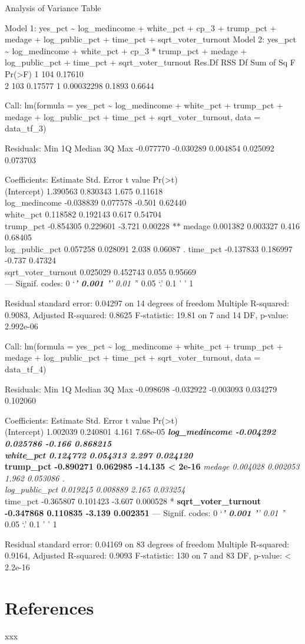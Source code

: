 \documentclass[
]{article}
\begin{document}
Analysis of Variance Table

Model 1: yes\_pct \textasciitilde{} log\_medincome + white\_pct + cp\_3
+ trump\_pct + medage + log\_public\_pct + time\_pct +
sqrt\_voter\_turnout Model 2: yes\_pct \textasciitilde{} log\_medincome
+ white\_pct + cp\_3 * trump\_pct + medage + log\_public\_pct +
time\_pct + sqrt\_voter\_turnout Res.Df RSS Df Sum of Sq F
Pr(\textgreater F) 1 104 0.17610\\
2 103 0.17577 1 0.00032298 0.1893 0.6644

Call: lm(formula = yes\_pct \textasciitilde{} log\_medincome +
white\_pct + trump\_pct + medage + log\_public\_pct + time\_pct +
sqrt\_voter\_turnout, data = data\_tf\_3)

Residuals: Min 1Q Median 3Q Max -0.077770 -0.030289 0.004854 0.025092
0.073703

Coefficients: Estimate Std. Error t value
Pr(\textgreater\textbar t\textbar)\\
(Intercept) 1.390563 0.830343 1.675 0.11618\\
log\_medincome -0.038839 0.077578 -0.501 0.62440\\
white\_pct 0.118582 0.192143 0.617 0.54704\\
trump\_pct -0.854305 0.229601 -3.721 0.00228 ** medage 0.001382 0.003327
0.416 0.68405\\
log\_public\_pct 0.057258 0.028091 2.038 0.06087 . time\_pct -0.137833
0.186997 -0.737 0.47324\\
sqrt\_voter\_turnout 0.025029 0.452743 0.055 0.95669\\
--- Signif. codes: 0 `\emph{\textbf{' 0.001 '}' 0.01 '}' 0.05 `.' 0.1 '
' 1

Residual standard error: 0.04297 on 14 degrees of freedom Multiple
R-squared: 0.9083, Adjusted R-squared: 0.8625 F-statistic: 19.81 on 7
and 14 DF, p-value: 2.992e-06

Call: lm(formula = yes\_pct \textasciitilde{} log\_medincome +
white\_pct + trump\_pct + medage + log\_public\_pct + time\_pct +
sqrt\_voter\_turnout, data = data\_tf\_4)

Residuals: Min 1Q Median 3Q Max -0.098698 -0.032922 -0.003093 0.034279
0.102060

Coefficients: Estimate Std. Error t value
Pr(\textgreater\textbar t\textbar)\\
(Intercept) 1.002039 0.240801 4.161 7.68e-05 \textbf{\emph{
log\_medincome -0.004292 0.025786 -0.166 0.868215\\
white\_pct 0.124772 0.054313 2.297 0.024120 }\\
trump\_pct -0.890271 0.062985 -14.135 \textless{} 2e-16 }\emph{ medage
0.004028 0.002053 1.962 0.053086 .\\
log\_public\_pct 0.019245 0.008889 2.165 0.033254 }\\
time\_pct -0.365807 0.101423 -3.607 0.000528 *\textbf{
sqrt\_voter\_turnout -0.347868 0.110835 -3.139 0.002351 } --- Signif.
codes: 0 `\emph{\textbf{' 0.001 '}' 0.01 '}' 0.05 `.' 0.1 ' ' 1

Residual standard error: 0.04169 on 83 degrees of freedom Multiple
R-squared: 0.9164, Adjusted R-squared: 0.9093 F-statistic: 130 on 7 and
83 DF, p-value: \textless{} 2.2e-16

\hypertarget{references}{%
\section{References}\label{references}}

xxx
\end{document}
